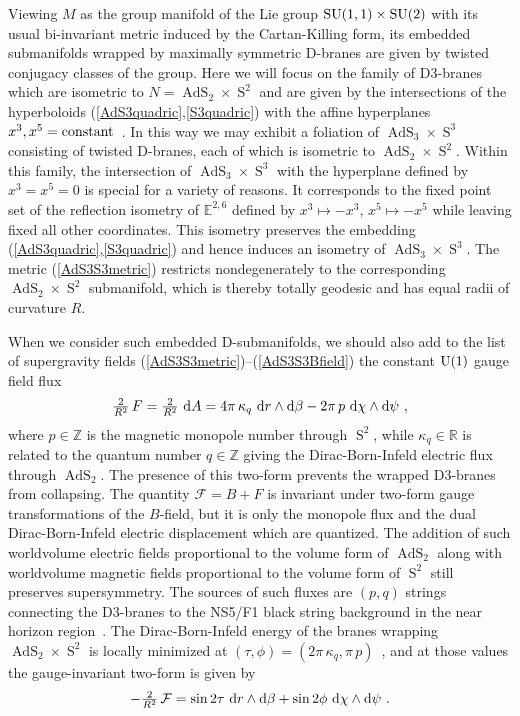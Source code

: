\documentclass[11pt,a4paper]{article}
\DeclareMathOperator{\AdS}{AdS}
\DeclareMathOperator{\Sphere}{S}
\let\S\Sphere
\def\dd{{\rm d}}
\newcommand{\zed}{{\mathbb Z}} %
\newcommand{\real}{{\mathbb R}} %
\newcommand{\eucl}{{\mathbb E}}
\newcommand{\beq}{\begin{eqnarray}}
\newcommand{\eeq}{\end{eqnarray}}
\begin{document}
Viewing $M$ as the group manifold of the Lie group ${\rm
  SU}(1,1)\times{\rm SU}(2)$ with its usual bi-invariant metric
induced by the Cartan-Killing form, its
  embedded submanifolds wrapped by maximally symmetric D-branes are given
  by twisted conjugacy classes of the group. Here we will focus on the
  family of D3-branes which are isometric to $N=\AdS_2\times\Sphere^2$
  and are given by the intersections of the hyperboloids
  (\ref{AdS3quadric},\ref{S3quadric}) with the affine hyperplanes
  $x^3,x^5={\rm constant}$~\cite{BP1}. In this way we may
  exhibit a foliation of $\AdS_3\times\S^3$ consisting of twisted
  D-branes, each of which is isometric to
  $\AdS_2\times\S^2$. Within this family, the intersection of
  $\AdS_3\times\S^3$ with the hyperplane defined by $x^3=x^5=0$ is
  special for a variety of reasons. It
  corresponds to the fixed point set of the reflection isometry of
  $\eucl^{2,6}$ defined by $x^3\mapsto-x^3$, $x^5\mapsto-x^5$ while
  leaving fixed all other coordinates. This isometry preserves the
  embedding (\ref{AdS3quadric},\ref{S3quadric}) and hence induces an
  isometry of $\AdS_3\times\S^3$. The metric (\ref{AdS3S3metric})
  restricts nondegenerately to the corresponding $\AdS_2\times\S^2$
  submanifold, which is thereby totally geodesic and has equal radii of
  curvature $R$.

When we consider such embedded D-submanifolds, we should also add to
the list of supergravity fields
(\ref{AdS3S3metric})--(\ref{AdS3S3Bfield}) the
constant ${\rm U}(1)$ gauge field flux~\cite{BP1,BDS1}
\beq
\mbox{$\frac2{R^2}$}\,F=\mbox{$\frac2{R^2}$}~
\dd A=4\pi\,\kappa_q~\dd r\wedge\dd\beta-
2\pi\,p~\dd\chi\wedge\dd\psi \ ,
\label{AdS3S3U1flux}\eeq
where $p\in\zed$ is the magnetic monopole number through $\S^2$,
while $\kappa_q\in\real$ is related to the quantum number $q\in\zed$ giving
the Dirac-Born-Infeld electric flux through $\AdS_2$. The presence of
this two-form prevents the wrapped D3-branes from collapsing. The quantity
${\mathcal F}=B+F$ is invariant under two-form gauge transformations
of the $B$-field, but it is only the monopole flux and the dual
Dirac-Born-Infeld electric displacement which
are quantized. The addition of such worldvolume electric fields
proportional to the volume form of $\AdS_2$ along with worldvolume
magnetic fields proportional to the volume form of $\S^2$ still
preserves supersymmetry. The sources of such fluxes are $(p,q)$
strings connecting the D3-branes to the NS5/F1 black string background
in the near horizon region~\cite{BP1}. The Dirac-Born-Infeld energy of
the branes wrapping $\AdS_2\times\S^2$ is locally minimized at
$(\tau,\phi)=(2\pi\,\kappa_q,\pi\,p)$~\cite{BP1,BDS1}, and at those
values the gauge-invariant two-form is given by
\beq
-\mbox{$\frac2{R^2}$}\,\mathcal{F}=\sin2\tau~\dd r\wedge\dd\beta+
\sin2\phi~\dd\chi\wedge\dd\psi \ .
\label{gaugeinvAdS3S3}\eeq
\end{document}
